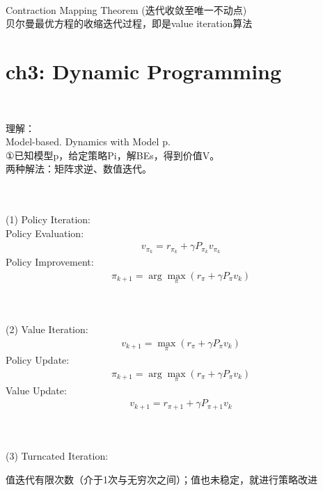 \documentclass{article}
\begin{document}
~ \\[3pt]
\begin{CJK}{UTF8}{gbsn}
    Contraction Mapping Theorem (迭代收敛至唯一不动点) \\[3pt]
    贝尔曼最优方程的收缩迭代过程，即是value iteration算法 \\[3pt]
\end{CJK}


\newpage
\section*{ch3: Dynamic Programming}

~ \\[3pt]
\begin{CJK}{UTF8}{gbsn}
    理解： \\[3pt]
    Model-based. Dynamics with Model p. \\[3pt]
    ①已知模型p，给定策略Pi，解BEs，得到价值V。 \\[3pt]
    两种解法：矩阵求逆、数值迭代。 \\[3pt]
\end{CJK}


~ \\[3pt]
~ \\[3pt]
(1) Policy Iteration: 
~ \\[3pt]
Policy Evaluation: 
\begin{align*}
    v_{\pi_{k}} = r_{\pi_{k}} + \gamma P_{\pi_{k}} v_{\pi_{k}} 
\end{align*}
Policy Improvement: 
\begin{align*}
    \pi_{k+1} = \arg \max_{\pi} 
    ( r_{\pi} + \gamma P_{\pi} v_{k} ) 
\end{align*}


~ \\[3pt]
~ \\[3pt]
(2) Value Iteration: 
\begin{align*}
    v_{k+1} = \max_{\pi} ( r_{\pi} + \gamma P_{\pi} v_{k} ) 
\end{align*}
Policy Update: 
\begin{align*}
    \pi_{k+1} = \arg \max_{\pi} 
    ( r_{\pi} + \gamma P_{\pi} v_{k} ) 
\end{align*}
Value Update: 
\begin{align*}
    v_{k+1} = r_{\pi+1} + \gamma P_{\pi+1} v_{k} 
\end{align*}


~ \\[3pt]
~ \\[3pt]
(3) Turncated Iteration: \\[3pt]
\begin{CJK}{UTF8}{gbsn}
    值迭代有限次数（介于1次与无穷次之间）；值也未稳定，就进行策略改进 \\[3pt]
\end{CJK}
\end{document}
